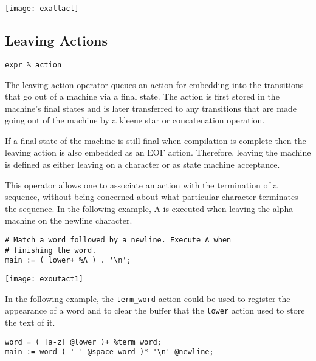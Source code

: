 \documentclass[letterpaper,11pt,oneside]{book}
\newcommand{\verbspace}{\vspace{10pt}}
\newcommand{\graphspace}{\vspace{10pt}}
\newenvironment{inline_code}{\def\baselinestretch{1}\vspace{12pt}\small}{}
\begin{document}
\graphspace
\begin{center}
\texttt{[image: exallact]}
\end{center}
\graphspace

\subsection{Leaving Actions}
\label{out-actions}

\verb|expr % action|

The leaving action operator queues an action for embedding into the transitions
that go out of a machine via a final state. The action is first stored in
the machine's final states and is later transferred to any transitions that are
made going out of the machine by a kleene star or concatenation operation.

If a final state of the machine is still final when compilation is complete
then the leaving action is also embedded as an EOF action. Therefore, leaving
the machine is defined as either leaving on a character or as state machine
acceptance.

This operator allows one to associate an action with the termination of a
sequence, without being concerned about what particular character terminates
the sequence. In the following example, A is executed when leaving the alpha
machine on the newline character.

\begin{inline_code}
\begin{verbatim}
# Match a word followed by a newline. Execute A when 
# finishing the word.
main := ( lower+ %A ) . '\n';
\end{verbatim}
\end{inline_code}
\verbspace
% }%%
% END GENERATE

\graphspace
\begin{center}
\texttt{[image: exoutact1]}
\end{center}
\graphspace

In the following example, the \verb|term_word| action could be used to register
the appearance of a word and to clear the buffer that the \verb|lower| action used
to store the text of it.

\begin{inline_code}
\begin{verbatim}
word = ( [a-z] @lower )+ %term_word;
main := word ( ' ' @space word )* '\n' @newline;
\end{verbatim}
\end{inline_code}
\verbspace
\end{document}
